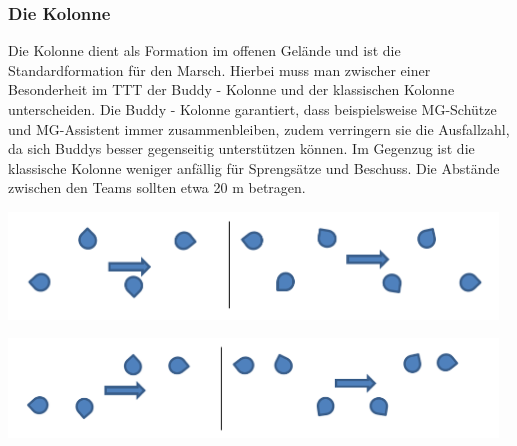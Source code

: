 \subsubsection{Die Kolonne}
Die Kolonne dient als Formation im offenen Gelände und ist die Standardformation für den Marsch. Hierbei muss man zwischer einer Besonderheit im \ac{TTT} der Buddy - Kolonne und der klassischen Kolonne unterscheiden. Die Buddy - Kolonne garantiert, dass beispielsweise MG-Schütze und MG-Assistent immer zusammenbleiben, zudem verringern sie die Ausfallzahl, da sich Buddys besser gegenseitig unterstützen können. Im Gegenzug ist die klassische Kolonne weniger anfällig für Sprengsätze und Beschuss. Die Abstände zwischen den Teams sollten etwa 20 m betragen.\\
\begin{minipage}[t]{1\textwidth}
	\includegraphics[width=13cm]{./Grafiken/Abschnitt/Kolonne.png}
	\label{Kolonne}
\end{minipage}
\begin{minipage}[t]{1\textwidth}
	\includegraphics[width=13cm]{./Grafiken/Abschnitt/Buddykolonne.png}
\end{minipage}

